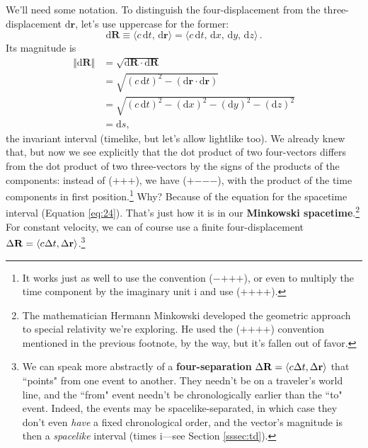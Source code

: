 \documentclass[12pt]{article}
\renewcommand{\vv}[1]{\mathbf{#1}}
\newcommand{\dd}[1]{\mathrm{d}#1}
\begin{document}
We'll need some notation. To distinguish the four-displacement from the three-displacement $\dd \vv r$, let's use uppercase for the former:
\begin{equation}\label{eq:30}
\boxed{\dd \vv R\equiv \langle c \, \dd t, \, \dd \vv r \rangle = \langle c\, \dd t, \, \dd x, \, \dd y, \, \dd z \rangle} \, .
\end{equation}
Its magnitude is
\begin{equation*}
\begin{split}
\Vert \dd \vv R \Vert &= \sqrt{\dd \vv R \cdot \dd \vv R}\\
&= \sqrt{(c \, \dd t)^2 - (\dd \vv r \cdot \dd \vv r)}\\
&= \sqrt{(c \, \dd t)^2 - (\dd x)^2 - (\dd y)^2 - (\dd z)^2}\\
&= \dd s,
\end{split}
\end{equation*}
the invariant interval (timelike, but let's allow lightlike too). We already knew that, but now we see explicitly that the dot product of two four-vectors differs from the dot product of two three-vectors by the signs of the products of the components: instead of ($+$$+$$+$), we have ($+$$-$$-$$-$), with the product of the time components in first position.\footnote{\label{fn:sc}It works just as well to use the convention ($-$$+$$+$$+$), or even to multiply the time component by the imaginary unit $\mathrm{i}$ and use ($+$$+$$+$$+$).} Why? Because of the equation for the spacetime interval (Equation \ref{eq:24}). That's just how it is in our \textbf{Minkowski spacetime}.\footnote{The mathematician Hermann Minkowski developed the geometric approach to special relativity we're exploring. He used the ($+$$+$$+$$+$) convention mentioned in the previous footnote, by the way, but it's fallen out of favor.} For constant velocity, we can of course use a finite four-displacement $\Delta \vv R = \langle c \mkern.5mu \Delta t, \Delta \vv r \rangle$.\footnote{\label{fn:sp}We can speak more abstractly of a \textbf{four-separation} $\Delta \vv R = \langle c \mkern.5mu \Delta t, \Delta \vv r \rangle$ that ``points" from one event to another. They needn't be on a traveler's world line, and the ``from" event needn't be chronologically earlier than the ``to" event. Indeed, the events may be spacelike-separated, in which case they don't even \emph{have} a fixed chronological order, and the vector's magnitude is then a \emph{spacelike} interval (times $\mathrm{i}$---see Section \ref{sssec:td}).}
\end{document}
